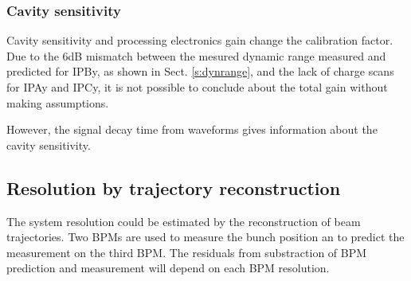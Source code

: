 \subsubsection{Cavity sensitivity}\label{s:resosensi}
Cavity sensitivity and processing electronics gain change the calibration factor. Due to the 6dB mismatch between the mesured dynamic range measured and predicted for IPBy, as shown in Sect. \ref{s:dynrange}, and the lack of charge scans for IPAy and IPCy, it is not possible to conclude about the total gain without making assumptions.\par
However, the signal decay time from waveforms gives information about the cavity sensitivity. 

\subsection{Resolution by trajectory reconstruction}
The system resolution could be estimated by the reconstruction of beam trajectories. Two BPMs are used to measure the bunch position an to predict the measurement on the third BPM. The residuals from substraction of BPM prediction and measurement will depend on each BPM resolution.\par

